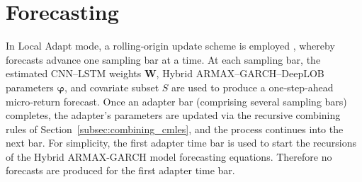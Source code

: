 \documentclass[10pt,a4paper,oneside]{article}
\newcommand{\Prob}{\mathbb{P}}
\DeclarePairedDelimiter{\aval}{\lvert}{\rvert} %
\begin{document}




\section{Forecasting}
\label{sec:forecasting}

In Local Adapt mode, a rolling‐origin update scheme is employed \cite{meisenbacher2022review}, whereby forecasts advance one sampling bar at a time.  At each sampling bar, the estimated CNN–LSTM weights \(\mathbf{W}\), Hybrid ARMAX–GARCH–DeepLOB parameters \(\boldsymbol{\varphi}\), and covariate subset \(S\) are used to produce a one‐step‐ahead micro‐return forecast.  Once an adapter bar (comprising several sampling bars) completes, the adapter’s parameters are updated via the recursive combining rules of Section~\ref{subsec:combining_cmles}, and the process continues into the next bar. For simplicity, the first adapter time bar is used to start the recursions of the Hybrid ARMAX-GARCH model forecasting equations. Therefore no forecasts are produced for the first adapter time bar.
\end{document}

